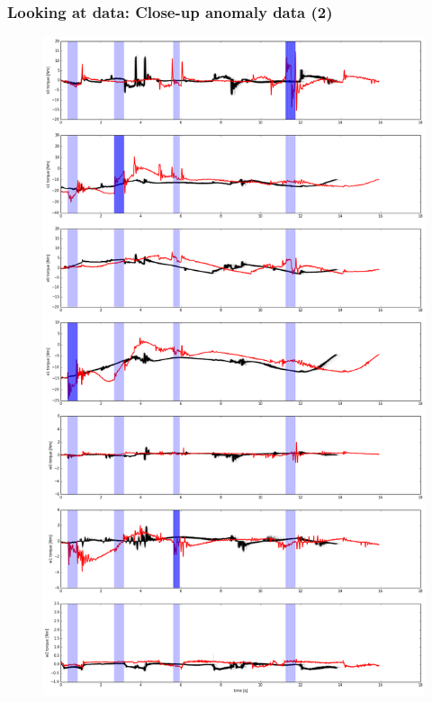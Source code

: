 \documentclass{beamer}
\newcommand{\datawidth}{.43\textwidth}
\begin{document}
    \begin{frame}
        \frametitle{Looking at data: Close-up anomaly data (2)}
        \begin{figure}
            \centering
            \includegraphics[width=\datawidth]{figs/anomaly50.png}
        \end{figure}
    \end{frame}
\end{document}
